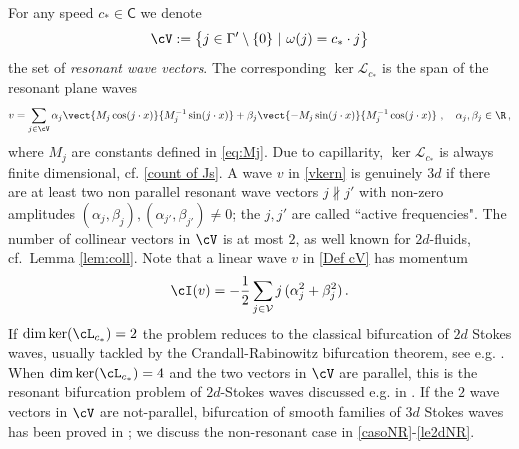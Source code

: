 \documentclass[11pt,a4paper,reqno]{article}
\numberwithin{equation}{section}
\theoremstyle{definition}
\begin{document}


For any %
speed 
   $c_*\in \mathsf C$
we  denote 
 \begin{equation}\label{Def cV}
        \cV:= \big\{
        j\in \Gamma'\setminus\{0\} \ | \ \omega(j)=c_*\cdot j \big\} 
    \end{equation}
the set of {\it resonant wave vectors}. 
The corresponding $ \ker {\mathcal L}_{c_*} $ 
    is the span of the  resonant plane waves  
\begin{equation}\label{vkern}
v = \sum_{j \in \cV }
\alpha_j 
\vect{M_j\cos(j\cdot x)}{M_{j}^{-1} \sin(j \cdot x)} + 
\beta_j \vect{-M_j\sin(j \cdot x)}{M_{j}^{-1}\cos(j \cdot x)}  \ ,  \quad  \alpha_j, \beta_j \in \R \, ,
\end{equation}
where $ M_j $ are constants defined in \eqref{eq:Mj}. 
Due to capillarity,  
    $ \ker {\mathcal L}_{c_*} $ 
   is  always finite dimensional, cf. 
    \eqref{count of Js}. 
A wave $ v $ in \eqref{vkern} is genuinely $ 3d$ if there are at least two  
non parallel resonant wave vectors $ j \not \parallel j'  $  with non-zero 
amplitudes $ (\alpha_j, \beta_j), (\alpha_{j'}, \beta_{j'}) \neq 0 $; the 
$ j, j' $ are called
``active frequencies".   
    The  number of collinear vectors in $ \cV$ is at most $ 2 $, 
    as  well known for 
    $2d $-fluids, cf.~Lemma \ref{lem:coll}. 
    Note that a   linear wave $ v $ in \eqref{Def cV} has momentum 
\begin{equation}\label{momeintro}
 \cI(v) =-\frac12 \sum_{j\in {\mathcal V}} j \, (\alpha_j^2+\beta_j^2) \, . 
\end{equation}
If $ \dim \ker(\cL_{c_*}) = 2 $ the problem reduces to the classical bifurcation of $ 2 d$ Stokes waves,
usually 
tackled  by the 
Crandall-Rabinowitz bifurcation theorem, see e.g. \cite{Wh0,M}. 
When $ \dim \ker(\cL_{c_*}) = 4 $ and the two  vectors in $ \cV $ are parallel, 
this is  %
the resonant bifurcation problem of $ 2 d$-Stokes waves discussed e.g. in %
\cite{JT,JT2,RS1,BBMM}.
If  the $ 2 $ 
wave vectors in $ \cV $  
are not-parallel,
bifurcation of 
 smooth families of $ 3d$  Stokes 
waves has been  
proved  in  \cite{RS,GrovesMielke,BG,Nil}; 
we discuss the 
non-resonant case
in  \eqref{casoNR}-\eqref{le2dNR}.
 
\end{document}
